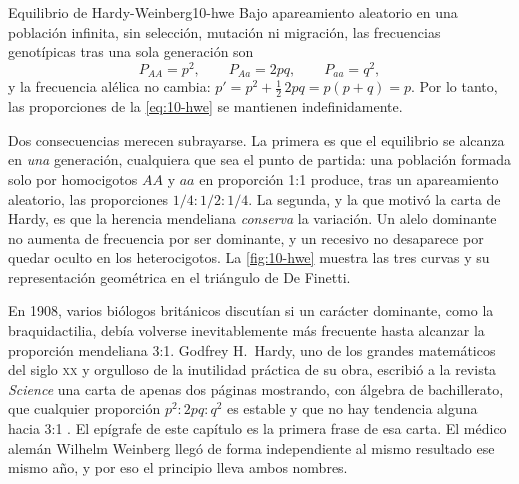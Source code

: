 \begin{teorema}{Equilibrio de Hardy-Weinberg}{10-hwe}
Bajo apareamiento aleatorio en una población infinita, sin selección, mutación ni migración, las frecuencias genotípicas tras una sola generación son
\begin{equation}\label{eq:10-hwe}
P_{AA}=p^2,\qquad P_{Aa}=2pq,\qquad P_{aa}=q^2,
\end{equation}
y la frecuencia alélica no cambia: $p'=p^2+\tfrac12\,2pq=p(p+q)=p$. Por lo tanto, las proporciones de la \cref{eq:10-hwe} se mantienen indefinidamente.
\end{teorema}

\begin{simbolos}
\end{simbolos}

Dos consecuencias merecen subrayarse. La primera es que el equilibrio se alcanza en \emph{una} generación, cualquiera que sea el punto de partida: una población formada solo por homocigotos $AA$ y $aa$ en proporción 1:1 produce, tras un apareamiento aleatorio, las proporciones $1/4:1/2:1/4$. La segunda, y la que motivó la carta de Hardy, es que la herencia mendeliana \emph{conserva} la variación. Un alelo dominante no aumenta de frecuencia por ser dominante, y un recesivo no desaparece por quedar oculto en los heterocigotos. La \cref{fig:10-hwe} muestra las tres curvas y su representación geométrica en el triángulo de De Finetti.

\begin{historia}
En 1908, varios biólogos británicos discutían si un carácter dominante, como la braquidactilia, debía volverse inevitablemente más frecuente hasta alcanzar la proporción mendeliana 3:1. Godfrey H.\ Hardy, uno de los grandes matemáticos del siglo \textsc{xx} y orgulloso de la inutilidad práctica de su obra, escribió a la revista \emph{Science} una carta de apenas dos páginas mostrando, con álgebra de bachillerato, que cualquier proporción $p^2:2pq:q^2$ es estable y que no hay tendencia alguna hacia 3:1 \parencite{c10-hardy1908}. El epígrafe de este capítulo es la primera frase de esa carta. El médico alemán Wilhelm Weinberg llegó de forma independiente al mismo resultado ese mismo año, y por eso el principio lleva ambos nombres.
\end{historia}

